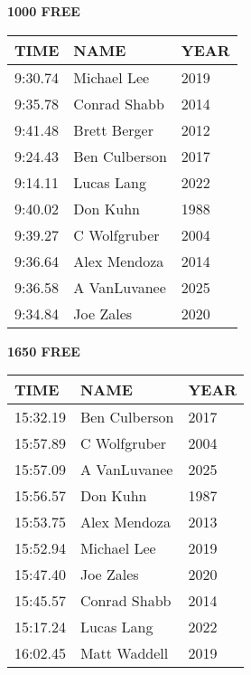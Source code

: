 \begin{minipage}[t]{0.48\textwidth}
\centering
\textbf{1000 FREE}\\[0.05cm]
\begin{tabular}{@{}p{1.8cm}p{2.8cm}p{1.2cm}@{}}
\hline
\textbf{TIME} & \textbf{NAME} & \textbf{YEAR} \\
\hline
9:30.74 & Michael Lee & 2019 \\
9:35.78 & Conrad Shabb & 2014 \\
9:41.48 & Brett Berger & 2012 \\
9:24.43 & Ben Culberson & 2017 \\
9:14.11 & Lucas Lang & 2022 \\
9:40.02 & Don Kuhn & 1988 \\
9:39.27 & C Wolfgruber & 2004 \\
9:36.64 & Alex Mendoza & 2014 \\
9:36.58 & A VanLuvanee & 2025 \\
9:34.84 & Joe Zales & 2020 \\
\hline
\end{tabular}
\end{minipage}\hfill
\begin{minipage}[t]{0.48\textwidth}
\centering
\textbf{1650 FREE}\\[0.05cm]
\begin{tabular}{@{}p{1.8cm}p{2.8cm}p{1.2cm}@{}}
\hline
\textbf{TIME} & \textbf{NAME} & \textbf{YEAR} \\
\hline
15:32.19 & Ben Culberson & 2017 \\
15:57.89 & C Wolfgruber & 2004 \\
15:57.09 & A VanLuvanee & 2025 \\
15:56.57 & Don Kuhn & 1987 \\
15:53.75 & Alex Mendoza & 2013 \\
15:52.94 & Michael Lee & 2019 \\
15:47.40 & Joe Zales & 2020 \\
15:45.57 & Conrad Shabb & 2014 \\
15:17.24 & Lucas Lang & 2022 \\
16:02.45 & Matt Waddell & 2019 \\
\hline
\end{tabular}
\end{minipage}

\vspace{0.4cm}


